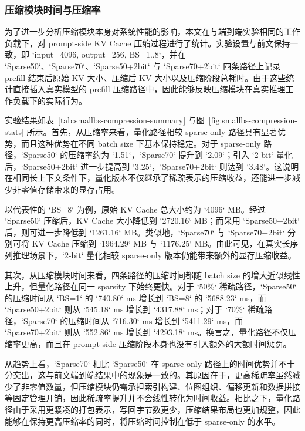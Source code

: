 \subsubsection{压缩模块时间与压缩率}

为了进一步分析压缩模块本身对系统性能的影响，本文在与端到端实验相同的工作负载下，对 prompt-side KV Cache 压缩过程进行了统计。实验设置与前文保持一致，即 `input=4096, output=256, BS=1..8`，并在 `Sparse50`、`Sparse70`、`Sparse50+2bit` 与 `Sparse70+2bit` 四条路径上记录 prefill 结束后原始 KV 大小、压缩后 KV 大小以及压缩阶段总耗时。由于这些统计直接插入真实模型的 prefill 压缩路径中，因此能够反映压缩模块在真实推理工作负载下的实际行为。

实验结果如表~\ref{tab:smallbs-compression-summary} 与图~\ref{fig:smallbs-compression-stats} 所示。首先，从压缩率来看，量化路径相较 sparse-only 路径具有显著优势，而且这种优势在不同 batch size 下基本保持稳定。对于 sparse-only 路径，`Sparse50` 的压缩率约为 `1.51\times`，`Sparse70` 提升到 `2.09\times`；引入 `2-bit` 量化后，`Sparse50+2bit` 进一步提高到 `3.25\times`，`Sparse70+2bit` 则达到 `3.48\times`。这说明在相同长上下文条件下，量化版本不仅继承了稀疏表示的压缩收益，还能进一步减少非零值存储带来的显存占用。

以代表性的 `BS=8` 为例，原始 KV Cache 总大小约为 `4096` MB。经过 `Sparse50` 压缩后，KV Cache 大小降低到 `2720.16` MB；而采用 `Sparse50+2bit` 后，则可进一步降低到 `1261.16` MB。类似地，`Sparse70` 与 `Sparse70+2bit` 分别可将 KV Cache 压缩到 `1964.29` MB 与 `1176.25` MB。由此可见，在真实长序列推理场景下，`2-bit` 量化相较 sparse-only 版本仍能带来额外的显存压缩收益。

其次，从压缩模块时间来看，四条路径的压缩时间都随 batch size 的增大近似线性上升，但量化路径在同一 sparsity 下始终更快。对于 `50\%` 稀疏路径，`Sparse50` 的压缩时间从 `BS=1` 的 `740.80` ms 增长到 `BS=8` 的 `5688.23` ms，而 `Sparse50+2bit` 则从 `545.18` ms 增长到 `4317.88` ms；对于 `70\%` 稀疏路径，`Sparse70` 的压缩时间从 `716.30` ms 增长到 `5411.29` ms，而 `Sparse70+2bit` 则从 `552.86` ms 增长到 `4293.18` ms。换言之，量化路径不仅压缩率更高，而且在 prompt-side 压缩阶段本身也没有引入额外的大额时间惩罚。

从趋势上看，`Sparse70` 相比 `Sparse50` 在 sparse-only 路径上的时间优势并不十分突出，这与前文端到端结果中的现象是一致的。其原因在于，更高稀疏率虽然减少了非零值数量，但压缩模块仍需承担索引构建、位图组织、偏移更新和数据拼接等固定管理开销，因此稀疏率提升并不会线性转化为时间收益。相比之下，量化路径由于采用更紧凑的打包表示，写回字节数更少，压缩结果布局也更加规整，因此能够在保持更高压缩率的同时，将压缩时间控制在低于 sparse-only 的水平。

